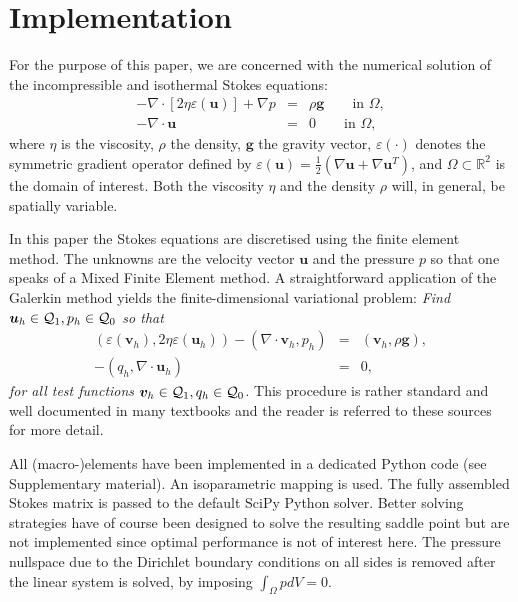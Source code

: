 \documentclass[a4paper,12pt]{article}
\begin{document}
\section{Implementation}


For the purpose of this paper, we are concerned with the numerical solution of 
the incompressible and isothermal Stokes equations:
\begin{eqnarray}
-\nabla \cdot \left[ 2\eta \varepsilon({\bm u}) \right] + \nabla p &=& \rho \bm g \qquad  \textrm{in $\Omega$},
\label{eq:conv_momentum}  \\  
-\nabla \cdot {\bm u} &=& 0    \qquad    \textrm{in $\Omega$},   \label{eq:conv_mass} 
\end{eqnarray}
where $\eta$ is the viscosity, $\rho$ the density, ${\bm g}$ the gravity vector, $\varepsilon(\cdot)$
denotes the symmetric gradient operator defined by $\varepsilon({\bm u})
=\frac 12 (\nabla {\bm u} + \nabla {\bm u}^{T})$, 
and $\Omega\subset{\mathbb R}^2$ is the domain
of interest. Both the viscosity $\eta$
and the density $\rho$ will, in general, be spatially variable.

In this paper the Stokes equations are discretised using the finite element method.
The unknowns are the velocity vector ${\bm u}$ and the pressure $p$ so that 
one speaks of a Mixed Finite Element method. 
A straightforward application of the Galerkin method yields the finite-dimensional 
variational problem: 
\textit{Find ${\bm u}_h\in {\cal Q}_1,p_h\in {\cal Q}_0$
so that
\begin{eqnarray}
\label{eq:discrete-formulation}
\left(\varepsilon(\bm v_h), 2\eta \varepsilon(\bm u_h)\right)  
- ( \nabla \cdot \bm v_h, p_h) &=&   ({\bm v}_h,\rho \bm g),\\
-(q_h,\nabla \cdot \bm u_h) &=& 0,
\end{eqnarray}
for all test functions ${\bm v}_h\in {\cal Q}_1, q_h\in {\cal Q}_0$.}
This procedure is rather standard and well documented in many 
textbooks \cite{grsa,dohu03,bobf13} and the reader is referred to these sources 
for more detail.

All (macro-)elements have been implemented in a dedicated Python code (see Supplementary material). 
An isoparametric mapping is used. 
The fully assembled Stokes matrix is passed to the default SciPy Python solver. 
Better solving strategies have of course 
been designed to solve the resulting saddle point \cite{begl05} but are not 
implemented since optimal performance is not of interest here.
The pressure nullspace due to the Dirichlet boundary conditions on all sides is removed 
after the linear system is solved, by imposing $\int_\Omega p dV= 0$.
\end{document}
